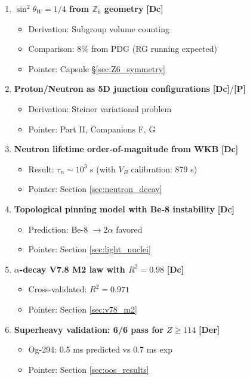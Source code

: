 \documentclass[11pt,a4paper]{article}
\newcommand{\tagP}{\textcolor{red!70!black}{\textbf{[P]}}}
\newcommand{\tagDc}{\textcolor{blue!70!black}{\textbf{[Dc]}}}
\newcommand{\tagDer}{\textcolor{green!50!black}{\textbf{[Der]}}}
\begin{document}
\begin{enumerate}
    \item \textbf{$\sin^2\theta_W = 1/4$ from $\mathbb{Z}_6$ geometry} \tagDc{}
    \begin{itemize}[nosep]
        \item Derivation: Subgroup volume counting
        \item Comparison: 8\% from PDG (RG running expected)
        \item Pointer: Capsule §\ref{sec:Z6_symmetry}
    \end{itemize}

    \item \textbf{Proton/Neutron as 5D junction configurations} \tagDc{}/\tagP{}
    \begin{itemize}[nosep]
        \item Derivation: Steiner variational problem
        \item Pointer: Part II, Companions F, G
    \end{itemize}

    \item \textbf{Neutron lifetime order-of-magnitude from WKB} \tagDc{}
    \begin{itemize}[nosep]
        \item Result: $\tau_n \sim 10^3$ s (with $V_B$ calibration: 879 s)
        \item Pointer: Section \ref{sec:neutron_decay}
    \end{itemize}

    \item \textbf{Topological pinning model with Be-8 instability} \tagDc{}
    \begin{itemize}[nosep]
        \item Prediction: Be-8 $\to 2\alpha$ favored
        \item Pointer: Section \ref{sec:light_nuclei}
    \end{itemize}

    \item \textbf{$\alpha$-decay V7.8 M2 law with $R^2 = 0.98$} \tagDc{}
    \begin{itemize}[nosep]
        \item Cross-validated: $R^2 = 0.971$
        \item Pointer: Section \ref{sec:v78_m2}
    \end{itemize}

    \item \textbf{Superheavy validation: 6/6 pass for $Z \geq 114$} \tagDer{}
    \begin{itemize}[nosep]
        \item Og-294: 0.5 ms predicted vs 0.7 ms exp
        \item Pointer: Section \ref{sec:oos_results}
    \end{itemize}
\end{enumerate}
\end{document}
